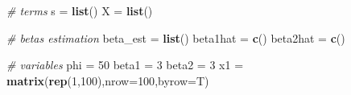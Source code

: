 \documentclass[]{article}
\newenvironment{Shaded}{\begin{snugshade}}{\end{snugshade}}
\newcommand{\CommentTok}[1]{\textcolor[rgb]{0.56,0.35,0.01}{\textit{#1}}}
\newcommand{\DataTypeTok}[1]{\textcolor[rgb]{0.13,0.29,0.53}{#1}}
\newcommand{\DecValTok}[1]{\textcolor[rgb]{0.00,0.00,0.81}{#1}}
\newcommand{\KeywordTok}[1]{\textcolor[rgb]{0.13,0.29,0.53}{\textbf{#1}}}
\newcommand{\NormalTok}[1]{#1}
\newcommand{\StringTok}[1]{\textcolor[rgb]{0.31,0.60,0.02}{#1}}
\begin{document}
\begin{Shaded}
\begin{Highlighting}[]
\CommentTok{# terms}
\NormalTok{s =}\StringTok{ }\KeywordTok{list}\NormalTok{()}
\NormalTok{X =}\StringTok{ }\KeywordTok{list}\NormalTok{()}

\CommentTok{# betas estimation}
\NormalTok{beta_est =}\StringTok{ }\KeywordTok{list}\NormalTok{()}
\NormalTok{beta1hat =}\StringTok{ }\KeywordTok{c}\NormalTok{()}
\NormalTok{beta2hat =}\StringTok{ }\KeywordTok{c}\NormalTok{()}

\CommentTok{# variables}
\NormalTok{phi =}\StringTok{ }\DecValTok{50}
\NormalTok{beta1 =}\StringTok{ }\DecValTok{3}
\NormalTok{beta2 =}\StringTok{ }\DecValTok{3}
\NormalTok{x1 =}\StringTok{ }\KeywordTok{matrix}\NormalTok{(}\KeywordTok{rep}\NormalTok{(}\DecValTok{1}\NormalTok{,}\DecValTok{100}\NormalTok{),}\DataTypeTok{nrow=}\DecValTok{100}\NormalTok{,}\DataTypeTok{byrow=}\NormalTok{T)}


\end{Highlighting}
\end{Shaded}
\end{document}
